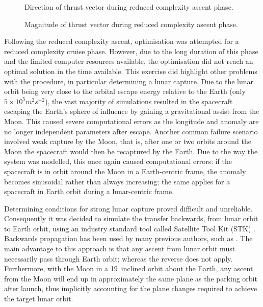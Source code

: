 \begin{figure}
\centering
\def\svgwidth{\figurewidth}

\caption{Direction of thrust vector during reduced complexity ascent phase.}
\label{fig:Ascent2-thrust}
\end{figure}

\begin{figure}
\centering
\def\svgwidth{\figurewidth}

\caption{Magnitude of thrust vector during reduced complexity ascent phase.}
\label{fig:Ascent2-thrustM}
\end{figure}



Following the reduced complexity ascent, optimisation was attempted for a reduced complexity cruise phase. However, due to the long duration of this phase and the limited computer resources available, the optimisation did not reach an optimal solution in the time available. This exercise did highlight other problems with the procedure, in particular determining a lunar capture. Due to the lunar orbit being very close to the orbital escape energy relative to the Earth (only $5\times10^5 m^2s^{-2}$), the vast majority of simulations resulted in the spacecraft escaping the Earth's sphere of influence by gaining a gravitational assist from the Moon. This caused severe computational errors as the longitude and anomaly are no longer independent parameters after escape. Another common failure scenario involved weak capture by the Moon, that is, after one or two orbits around the Moon the spacecraft would then be recaptured by the Earth. Due to the way the system was modelled, this once again caused computational errors: if the spacecraft is in orbit around the Moon in a Earth-centric frame, the anomaly becomes sinusoidal rather than always increasing; the same applies for a spacecraft in Earth orbit during a lunar-centric frame.

Determining conditions for strong lunar capture proved difficult and unreliable. Consequently it was decided to simulate the transfer backwards, from lunar orbit to Earth orbit, using an industry standard tool called Satellite Tool Kit (STK) \parencite{STK}. Backwards propagation has been used by many previous authors, such as \textcite{Author}. The main advantage to this approach is that any ascent from lunar orbit must necessarily pass through Earth orbit; whereas the reverse does not apply. Furthermore, with the Moon in a 19\degrees\ inclined orbit about the Earth, any ascent from the Moon will end up in approximately the same plane as the parking orbit after launch, thus implicitly accounting for the plane changes required to achieve the target lunar orbit.


